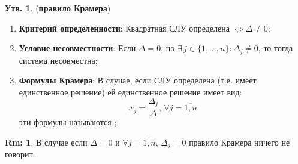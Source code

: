 \documentclass[12pt]{article}
\theoremstyle{definition}
\newtheorem{rem}{Rm:}
\newtheorem{prop}{Утв.}
\begin{document}
\begin{prop}(\textbf{правило Крамера})
	\begin{enumerate}[label=\arabic*)]
		\item \textbf{Критерий определенности}: Квадратная СЛУ определена $\Leftrightarrow \Delta \neq 0$;
		\item \textbf{Условие несовместности}: Если $\Delta = 0$, но $\exists \, j \in \{1,\dotsc,n\}\colon \Delta_j \neq 0$, то тогда система несовместна;
		\item \textbf{Формулы Крамера}: В случае, если СЛУ определена (т.е. имеет единственное решение) её единственное решение имеет вид:
		$$
			x_j = \dfrac{\Delta_j}{\Delta}, \, \forall j = \overline{1,n}
		$$
		эти формулы называются ;
	\end{enumerate}
\end{prop}
\begin{rem}
	В случае если $\Delta = 0$ и $\forall j =\overline{1,n}, \, \Delta_j = 0$ правило Крамера ничего не говорит.
\end{rem}
\end{document}
